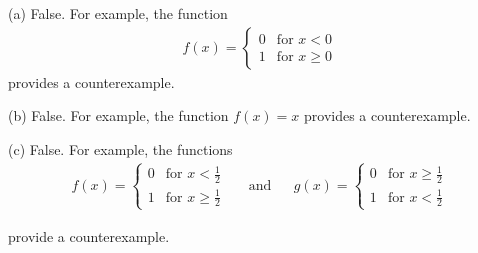 \begin{answer}
(a) False. For example, the function
\begin{align*}
f(x) = \begin{cases}
               0 & \text{for $x<0$} \\
               1 & \text{for $x\ge0$}
      \end{cases}
\end{align*}
provides a counterexample.

\noindent (b)
False. For example, the function $f(x)=x$ provides a counterexample.

\noindent (c)
False. For example, the functions
\begin{align*}
f(x) = \begin{cases}
               0 & \text{for $x<\frac{1}{2}$} \\
               1 & \text{for $x\ge\frac{1}{2}$}
      \end{cases}
&&\mbox{and}&&g(x) = \begin{cases}
               0 & \text{for $x\ge \frac{1}{2}$} \\
               1 & \text{for $x<\frac{1}{2}$}
      \end{cases}
\end{align*}


 provide a counterexample.


\end{answer}

